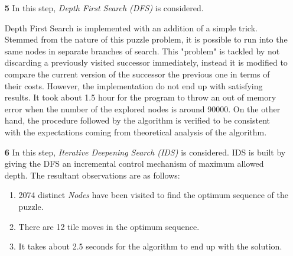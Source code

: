 \documentclass[12pt]{article}
\begin{document}
\begin{enumerate}
	\item [\textbf{5}] In this step, \textit{Depth First Search (DFS)} is considered.
	
	Depth First Search is implemented with an addition of a simple trick. 
	Stemmed from the nature of this puzzle problem, it is possible to run into the same nodes in separate branches of search. 
	This "problem" is tackled by not discarding a previously visited successor immediately, instead it is modified to compare the current version of the successor the previous one in terms of their costs. 
	However, the implementation do not end up with satisfying results. It took about 1.5 hour for the program to throw an out of memory error when the number of the explored nodes is around 90000.
	On the other hand, the procedure followed by the algorithm is verified to be consistent with the expectations coming from theoretical analysis of the algorithm.
	
	\item [\textbf{6}] In this step, \textit{Iterative Deepening Search (IDS)} is considered.
	IDS is built by giving the DFS an incremental control mechanism of maximum allowed depth. 
	The resultant observations are as follows:
	
	\begin{enumerate}
		\item 2074 distinct \textit{Nodes} have been visited to find the optimum sequence of the puzzle.
		\item There are 12 tile moves in the optimum sequence.
		\item It takes about 2.5 seconds for the algorithm to end up with the solution.		
	\end{enumerate}


\end{enumerate}
\end{document}
